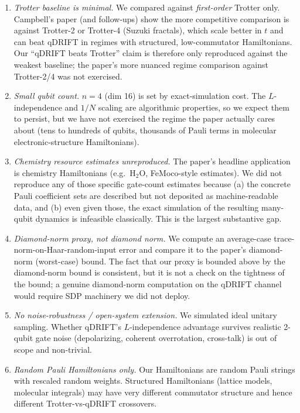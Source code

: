 \documentclass[11pt]{article}
\begin{document}
\begin{enumerate}
  \item \emph{Trotter baseline is minimal.} We compared against
        \emph{first-order} Trotter only. Campbell's paper (and follow-ups)
        show the more competitive comparison is against Trotter-2 or
        Trotter-4 (Suzuki fractals), which scale better in $t$ and can beat
        qDRIFT in regimes with structured, low-commutator Hamiltonians. Our
        ``qDRIFT beats Trotter'' claim is therefore only reproduced against
        the weakest baseline; the paper's more nuanced regime comparison
        against Trotter-2/4 was not exercised.
  \item \emph{Small qubit count.} $n = 4$ (dim 16) is set by exact-simulation
        cost. The $L$-independence and $1/N$ scaling are algorithmic
        properties, so we expect them to persist, but we have not exercised
        the regime the paper actually cares about (tens to hundreds of
        qubits, thousands of Pauli terms in molecular electronic-structure
        Hamiltonians).
  \item \emph{Chemistry resource estimates unreproduced.} The paper's
        headline application is chemistry Hamiltonians (e.g.\ H$_{2}$O,
        FeMoco-style estimates). We did not reproduce any of those specific
        gate-count estimates because (a) the concrete Pauli coefficient sets
        are described but not deposited as machine-readable data, and
        (b) even given those, the exact simulation of the resulting
        many-qubit dynamics is infeasible classically. This is the largest
        substantive gap.
  \item \emph{Diamond-norm proxy, not diamond norm.} We compute an
        average-case trace-norm-on-Haar-random-input error and compare it to
        the paper's diamond-norm (worst-case) bound. The fact that our
        proxy is bounded above by the diamond-norm bound is consistent, but
        it is not a check on the tightness of the bound; a genuine
        diamond-norm computation on the qDRIFT channel would require SDP
        machinery we did not deploy.
  \item \emph{No noise-robustness / open-system extension.} We simulated
        ideal unitary sampling. Whether qDRIFT's $L$-independence advantage
        survives realistic 2-qubit gate noise (depolarizing, coherent
        overrotation, cross-talk) is out of scope and non-trivial.
  \item \emph{Random Pauli Hamiltonians only.} Our Hamiltonians are random
        Pauli strings with rescaled random weights. Structured Hamiltonians
        (lattice models, molecular integrals) may have very different
        commutator structure and hence different Trotter-vs-qDRIFT
        crossovers.
\end{enumerate}
\end{document}
